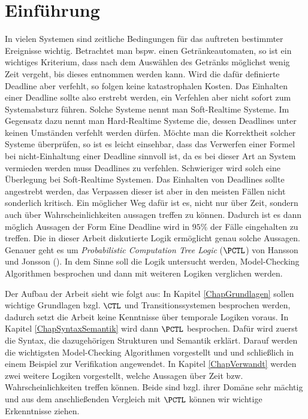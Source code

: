 \section{Einführung}

In vielen Systemen sind zeitliche Bedingungen für das auftreten bestimmter Ereignisse wichtig.
Betrachtet man bspw. einen Getränkeautomaten, so ist ein wichtiges Kriterium, dass nach dem Auswählen des Getränks möglichst wenig Zeit vergeht, bis dieses entnommen werden kann.
Wird die dafür definierte Deadline aber verfehlt, so folgen keine katastrophalen Kosten.
Das Einhalten einer Deadline sollte also erstrebt werden, ein Verfehlen aber nicht sofort zum Systemabsturz führen.
Solche Systeme nennt man Soft-Realtime Systeme.
Im Gegensatz dazu nennt man Hard-Realtime Systeme die, dessen Deadlines unter keinen Umständen verfehlt werden dürfen.
Möchte man die Korrektheit solcher Systeme überprüfen, so ist es leicht einsehbar, dass das Verwerfen einer Formel bei nicht-Einhaltung einer Deadline sinnvoll ist, da es bei dieser Art an System vermieden werden muss Deadlines zu verfehlen.
Schwieriger wird solch eine Überlegung bei Soft-Realtime Systemen.
Das Einhalten von Deadlines sollte angestrebt werden, das Verpassen dieser ist aber in den meisten Fällen nicht sonderlich kritisch.
Ein möglicher Weg dafür ist es, nicht nur über Zeit, sondern auch über Wahrscheinlichkeiten aussagen treffen zu können.
Dadurch ist es dann möglich Aussagen der Form \glqq{}Eine Deadline wird in $95\%$ der Fälle eingehalten\grqq{} zu treffen.
Die in dieser Arbeit diskutierte Logik ermöglicht genau solche Aussagen.
Genauer geht es um \textit{Probabilistic Computation Tree Logic} ($\PCTL$) von Hansson und Jonsson (\cite{hansson1994logic}).
In dem Sinne soll die Logik untersucht werden, Model-Checking Algorithmen besprochen und dann mit weiteren Logiken verglichen werden.

Der Aufbau der Arbeit sieht wie folgt aus: 
In Kapitel \ref{ChapGrundlagen} sollen wichtige Grundlagen bzgl. $\CTL$ und Transitionssystemen besprochen werden, dadurch setzt die Arbeit keine Kenntnisse über temporale Logiken voraus.
In Kapitel \ref{ChapSyntaxSemantik} wird dann $\PCTL$ besprochen.
Dafür wird zuerst die Syntax, die dazugehörigen Strukturen und Semantik erklärt.
Darauf werden die wichtigsten Model-Checking Algorithmen vorgestellt und und schließlich in einem Beispiel zur Verifikation angewendet.
In Kapitel \ref{ChapVerwandt} werden zwei weitere Logiken vorgestellt, welche Aussagen über Zeit bzw. Wahrscheinlichkeiten treffen können.
Beide sind bzgl. ihrer Domäne sehr mächtig und aus dem anschließenden Vergleich mit $\PCTL$ können wir wichtige Erkenntnisse ziehen.

